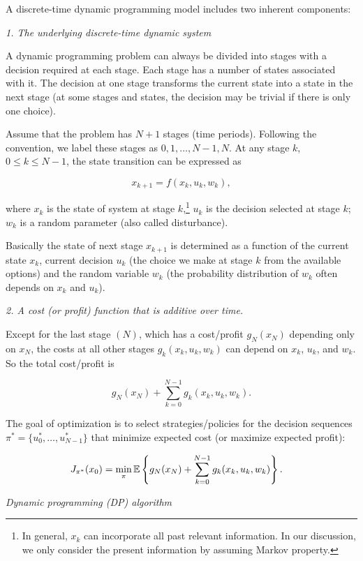A discrete-time dynamic programming model includes two inherent components:

\noindent\emph{1. The underlying discrete-time dynamic system}

A dynamic programming problem can always be divided into stages with a decision
required at each stage. Each stage has a number of states associated with it. The
decision at one stage transforms the current state into a state in the next stage
(at some stages and states, the decision may be trivial if there is only one
choice).

Assume that the problem has $N+1$ stages (time periods). Following the convention,
we label these stages as $0,1,\ldots,N-1,N$. At any stage $k$, $0\leq k\leq N-1$,
the state transition can be expressed as

\[
x_{k+1}=f(x_k,u_k,w_k),
\]

where $x_k$ is the state of system at stage $k$,\footnote[11]{In general, $x_k$
can incorporate all past relevant information. In our discussion, we only consider
the present information by assuming Markov property.} $u_k$ is the decision
selected at stage $k$; $w_k$ is a random parameter (also called disturbance).


Basically the state of next stage $x_{k+1}$ is determined as a function of the
current state $x_k$, current decision $u_k$ (the choice we make at stage $k$ from
the available options) and the random variable $w_k$ (the probability distribution
of $w_k$ often depends on $x_k$ and $u_k$).

\noindent\emph{2. A cost (or profit) function that is additive over time.}

Except for the last stage $(N)$, which has a cost/profit $g_N(x_N)$ depending only
on $x_N$, the costs at all other stages $g_k(x_k,u_k,w_k)$ can depend on $x_k$,
$u_k$, and $w_k$. So the total cost/profit is

\[
g_N(x_N)+\sum_{k=0}^{N-1}g_k(x_k,u_k,w_k).
\]

The goal of optimization is to select strategies/policies for the decision
sequences $\pi^*=\{u_0^*,\ldots,u_{N-1}^*\}$ that minimize expected cost (or
maximize expected profit):

\[
\begin{aligned}
J_{\pi^*}(x_0)
&=\min_{\pi}\mathbb{E}\left\{g_N(x_N)+\sum_{k=0}^{N-1}g_k(x_k,u_k,w_k)\right\}.
\end{aligned}
\]

\emph{Dynamic programming (DP) algorithm}

